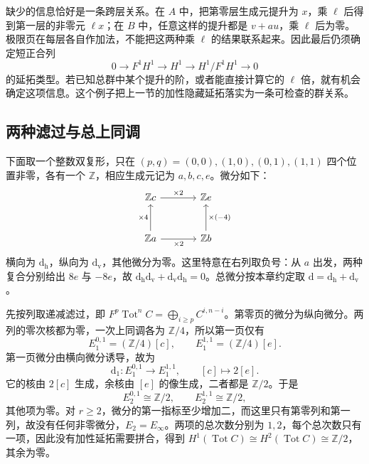 \ProseParagraphBreak

缺少的信息恰好是一条跨层关系。在 \(A\) 中，把第零层生成元提升为 \(x\)，乘 \(\ell\) 后得到第一层的非零元 \(\ell x\)；在 \(B\) 中，任意这样的提升都是 \(v+au\)，乘 \(\ell\) 后为零。极限页在每层各自作加法，不能把这两种乘 \(\ell\) 的结果联系起来。因此最后仍须确定短正合列
\[
	0\longrightarrow F^1H^1\longrightarrow H^1\longrightarrow H^1/F^1H^1\longrightarrow0
\]
的延拓类型。若已知总群中某个提升的阶，或者能直接计算它的 \(\ell\) 倍，就有机会确定这项信息。这个例子把上一节的加性隐藏延拓落实为一条可检查的群关系。

\subsection{两种滤过与总上同调}
\label{g2:subsec:1005:02}

下面取一个整数双复形，只在 \((p,q)=(0,0),(1,0),(0,1),(1,1)\) 四个位置非零，各有一个 \(\mathbb Z\)，相应生成元记为 \(a,b,c,e\)。微分如下：
\[
	\begin{tikzcd}[column sep=large,row sep=large]
		\mathbb Z c \arrow[r,"\times2"] & \mathbb Z e \\
		\mathbb Z a \arrow[r,"\times2"'] \arrow[u,"\times4"] & \mathbb Z b \arrow[u,"\times(-4)"']
	\end{tikzcd}
\]
横向为 \(\mathrm d_{\mathrm h}\)，纵向为 \(\mathrm d_{\mathrm v}\)，其他微分为零。这里特意在右列取负号：从 \(a\) 出发，两种复合分别给出 \(8e\) 与 \(-8e\)，故 \(\mathrm d_{\mathrm h}\mathrm d_{\mathrm v}+\mathrm d_{\mathrm v}\mathrm d_{\mathrm h}=0\)。总微分按本章约定取 \(\mathrm d=\mathrm d_{\mathrm h}+\mathrm d_{\mathrm v}\)。

\ProseParagraphBreak

先按列取递减滤过，即 \(F^p\operatorname{Tot}^nC=\bigoplus_{i\ge p}C^{i,n-i}\)。第零页的微分为纵向微分。两列的零次核都为零，一次上同调各为 \(\mathbb Z/4\)，所以第一页仅有
\[
	E_1^{0,1}=(\mathbb Z/4)[c],\qquad
	E_1^{1,1}=(\mathbb Z/4)[e].
\]
第一页微分由横向微分诱导，故为
\[
	\mathrm d_1:E_1^{0,1}\longrightarrow E_1^{1,1},\qquad[c]\longmapsto2[e].
\]
它的核由 \(2[c]\) 生成，余核由 \([e]\) 的像生成，二者都是 \(\mathbb Z/2\)。于是
\[
	E_2^{0,1}\cong\mathbb Z/2,\qquad E_2^{1,1}\cong\mathbb Z/2,
\]
其他项为零。对 \(r\ge2\)，微分的第一指标至少增加二，而这里只有第零列和第一列，故没有任何非零微分，\(E_2=E_\infty\)。两项的总次数分别为 \(1,2\)，每个总次数只有一项，因此没有加性延拓需要拼合，得到 \(H^1(\operatorname{Tot}C)\cong H^2(\operatorname{Tot}C)\cong\mathbb Z/2\)，其余为零。

\ProseParagraphBreak

